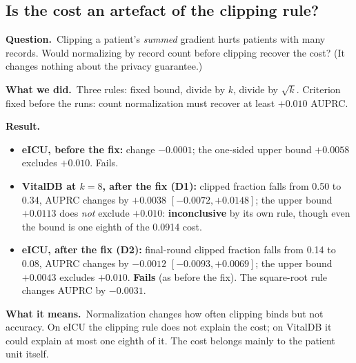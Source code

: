 \documentclass[11pt,a4paper]{article}
\newenvironment{experiment}[2]{\subsection{#1}\label{#2}}{}
\newcommand{\Q}{\par\textbf{Question.}\ }
\newcommand{\D}{\par\textbf{What we did.}\ }
\newcommand{\R}{\par\textbf{Result.}\ }
\newcommand{\M}{\par\textbf{What it means.}\ }
\begin{document}
\begin{experiment}{Is the cost an artefact of the clipping rule?}{exp:clip}
\Q Clipping a patient's \emph{summed} gradient hurts patients with many
records. Would normalizing by record count before clipping recover the cost?
(It changes nothing about the privacy guarantee.)
\D Three rules: fixed bound, divide by $k$, divide by $\sqrt{k}$. Criterion fixed
before the runs: count normalization must recover at least $+0.010$ AUPRC.
\R
\begin{itemize}
\item \textbf{eICU, before the fix:} change $-0.0001$; the one-sided upper
bound $+0.0058$ excludes $+0.010$. Fails.
\item \textbf{VitalDB at $k = 8$, after the fix (D1):} clipped fraction falls
from 0.50 to 0.34, AUPRC changes by $+0.0038$ $[-0.0072, +0.0148]$; the upper
bound $+0.0113$ does \emph{not} exclude $+0.010$: \textbf{inconclusive} by its
own rule, though even the bound is one eighth of the 0.0914 cost.
\item \textbf{eICU, after the fix (D2):} final-round clipped fraction falls
from 0.14 to 0.08, AUPRC changes by $-0.0012$ $[-0.0093, +0.0069]$; the upper
bound $+0.0043$ excludes $+0.010$. \textbf{Fails} (as before the fix). The
square-root rule changes AUPRC by $-0.0031$.
\end{itemize}
\M Normalization changes how often clipping binds but not accuracy. On eICU
the clipping rule does not explain the cost; on VitalDB it could explain at
most one eighth of it. The cost belongs mainly to the patient unit itself.
\end{experiment}
\end{document}
